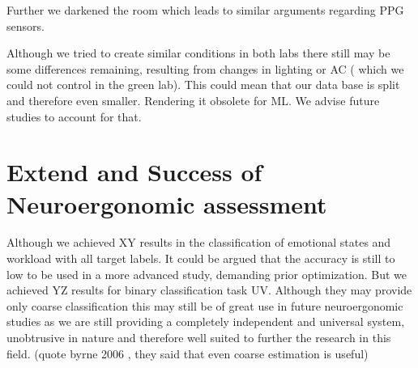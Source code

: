 Further we darkened the room which leads to similar arguments regarding PPG sensors.

Although we tried to create similar conditions in both labs there still may be some differences remaining, resulting from changes in lighting or AC ( which we could not control in the green lab). This could mean that our data base is split and therefore even smaller. Rendering it obsolete for ML. We advise future studies to account for that.

\section{Extend and Success of Neuroergonomic assessment}
Although we achieved XY results in the classification of emotional states and workload with all target labels. It could be argued that the accuracy is still to low to be used in a more advanced study, demanding prior optimization.
But we achieved YZ results for binary classification task UV. Although they may provide only coarse classification this may still be of great use in future neuroergonomic studies as we are still providing a completely independent and universal system, unobtrusive in nature and therefore well suited to further the research in this field. (quote byrne 2006 , they said that even coarse estimation is useful)
